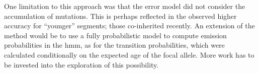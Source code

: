 One limitation to this approach was that the error model did not consider the accumulation of mutations.
This is perhaps reflected in the observed higher accuracy for ``younger'' segments; \ie those co-inherited recently.
An extension of the method would be to use a fully probabilistic model to compute emission probabilities in the \gls{hmm}, as for the transition probabilities, which were calculated conditionally on the expected age of the focal allele.
More work has to be invested into the exploration of this possibility.

%
%
%
%
